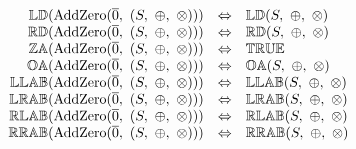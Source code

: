 \[
\begin{array}{rcl} 
\propname{LD}(\mathrm{AddZero}(\overline{0},\ (S,\ \oplus,\ \otimes))) 
    & \Leftrightarrow %
    & \propname{LD}(S,\ \oplus,\ \otimes) \\
\propname{RD}(\mathrm{AddZero}(\overline{0},\ (S,\ \oplus,\ \otimes))) 
    & \Leftrightarrow %
    & \propname{RD}(S,\ \oplus,\ \otimes) \\
\propname{ZA}(\mathrm{AddZero}(\overline{0},\ (S,\ \oplus,\ \otimes))) 
    & \Leftrightarrow %
    & \propname{TRUE}\\ 
\propname{OA}(\mathrm{AddZero}(\overline{0},\ (S,\ \oplus,\ \otimes))) 
    & \Leftrightarrow %
    & \propname{OA}(S,\ \oplus,\ \otimes) \\
\propname{LLAB}(\mathrm{AddZero}(\overline{0},\ (S,\ \oplus,\ \otimes))) 
    & \Leftrightarrow %
    & \propname{LLAB}(S,\ \oplus,\ \otimes)\\
\propname{LRAB}(\mathrm{AddZero}(\overline{0},\ (S,\ \oplus,\ \otimes))) 
    & \Leftrightarrow %
    & \propname{LRAB}(S,\ \oplus,\ \otimes)\\ 
\propname{RLAB}(\mathrm{AddZero}(\overline{0},\ (S,\ \oplus,\ \otimes))) 
    & \Leftrightarrow %
    & \propname{RLAB}(S,\ \oplus,\ \otimes)\\ 
\propname{RRAB}(\mathrm{AddZero}(\overline{0},\ (S,\ \oplus,\ \otimes))) 
    & \Leftrightarrow %
    & \propname{RRAB}(S,\ \oplus,\ \otimes)\\ 

\end{array} 
\] 
